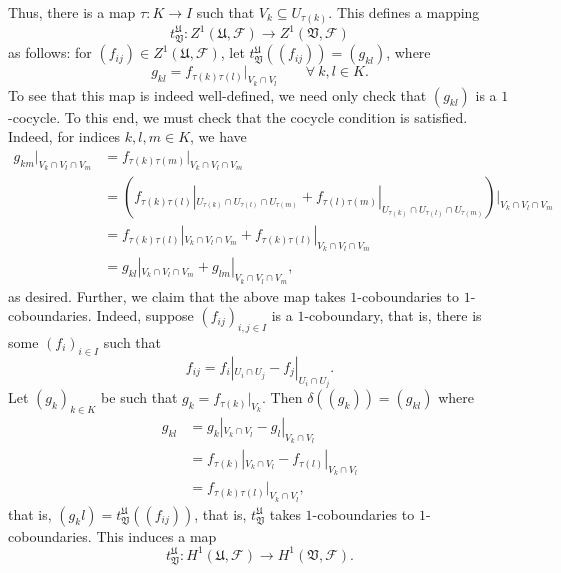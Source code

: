 \documentclass[12pt]{article}
\theoremstyle{thmstyle}
\theoremstyle{defstyle}
\newcommand{\frakU}{\mathfrak{U}}
\newcommand{\frakV}{\mathfrak{V}}
\newcommand{\scrF}{\mathscr F}
\begin{document}
Thus, there is a map $\tau: K\to I$ such that $V_k\subseteq U_{\tau(k)}$. This defines a mapping 
\begin{equation*}
    t^{\frakU}_{\frakV}: Z^1(\frakU,\scrF)\to Z^1(\frakV,\scrF)
\end{equation*}
as follows: for $(f_{ij})\in Z^1(\frakU,\scrF)$, let $t^{\frakU}_{\frakV}\left((f_{ij})\right) = (g_{kl})$, where 
\begin{equation*}
    g_{kl} = f_{\tau(k)\tau(l)}|_{V_k\cap V_l}\qquad\forall~k, l\in K.
\end{equation*}
To see that this map is indeed well-defined, we need only check that $(g_{kl})$ is a $1$-cocycle. To this end, we must check that the cocycle condition is satisfied. Indeed, for indices $k,l,m\in K$, we have 
\begin{align*}
    g_{km}|_{V_k\cap V_l\cap V_m} &= f_{\tau(k)\tau(m)}|_{V_k\cap V_l\cap V_m}\\
    &= \left(f_{\tau(k)\tau(l)}|_{U_{\tau(k)}\cap U_{\tau(l)}\cap U_{\tau(m)}} + f_{\tau(l)\tau(m)}|_{U_{\tau(k)}\cap U_{\tau(l)}\cap U_{\tau(m)}}\right)|_{V_k\cap V_l\cap V_m}\\
    &= f_{\tau(k)\tau(l)}|_{V_k\cap V_l\cap V_m} + f_{\tau(k)\tau(l)}|_{V_k\cap V_l\cap V_m}\\
    &= g_{kl}|_{V_k\cap V_l\cap V_m} + g_{lm}|_{V_k\cap V_l\cap V_m},
\end{align*}
as desired. Further, we claim that the above map takes $1$-coboundaries to $1$-coboundaries. Indeed, suppose $(f_{ij})_{i,j\in I}$ is a $1$-coboundary, that is, there is some $(f_i)_{i\in I}$ such that 
\begin{equation*}
    f_{ij} = f_i|_{U_i\cap U_j} - f_j|_{U_i\cap U_j}.
\end{equation*}
Let $(g_k)_{k\in K}$ be such that $g_k = f_{\tau(k)}|_{V_k}$. Then $\delta\left((g_k)\right) = (g_{kl})$ where 
\begin{align*}
    g_{kl} &= g_k|_{V_k\cap V_l} - g_l|_{V_k\cap V_l}\\
    &= f_{\tau(k)}|_{V_k\cap V_l} - f_{\tau(l)}|_{V_k\cap V_l}\\
    &= f_{\tau(k)\tau(l)}|_{V_k\cap V_l},
\end{align*}
that is, $(g_kl) = t^{\frakU}_{\frakV}\left((f_{ij})\right)$, that is, $t^{\frakU}_{\frakV}$ takes $1$-coboundaries to $1$-coboundaries. This induces a map 
\begin{equation*}
    t^{\frakU}_{\frakV}: H^1(\frakU,\scrF)\to H^1(\frakV,\scrF).
\end{equation*}
\end{document}

